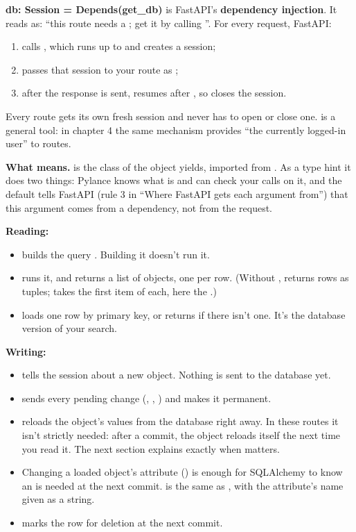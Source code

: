 \textbf{db: Session = Depends(get\_db)} is FastAPI's \textbf{dependency injection}. It reads as: ``this route needs a ; get it by calling ''. For every request, FastAPI:
\begin{enumerate}
\item calls , which runs up to  and creates a session;
\item passes that session to your route as ;
\item after the response is sent, resumes  after , so  closes the session.
\end{enumerate}
Every route gets its own fresh session and never has to open or close one.  is a general tool: in chapter 4 the same mechanism provides ``the currently logged-in user'' to routes.

\textbf{What  means.}  is the class of the object  yields, imported from . As a type hint it does two things: Pylance knows what  is and can check your calls on it, and the default  tells FastAPI (rule 3 in ``Where FastAPI gets each argument from'') that this argument comes from a dependency, not from the request.

\textbf{Reading:}
\begin{itemize}
\item {} builds the query . Building it doesn't run it.
\item {} runs it, and  returns a list of  objects, one per row. (Without ,  returns rows as tuples;  takes the first item of each, here the .)
\item {} loads one row by primary key, or returns  if there isn't one. It's the database version of your  search.
\end{itemize}

\textbf{Writing:}
\begin{itemize}
\item {} tells the session about a new object. Nothing is sent to the database yet.
\item {} sends every pending change (, , ) and makes it permanent.
\item {} reloads the object's values from the database right away. In these routes it isn't strictly needed: after a commit, the object reloads itself the next time you read it. The next section explains exactly when  matters.
\item Changing a loaded object's attribute () is enough for SQLAlchemy to know an  is needed at the next commit.  is the same as , with the attribute's name given as a string.
\item {} marks the row for deletion at the next commit.
\end{itemize}

